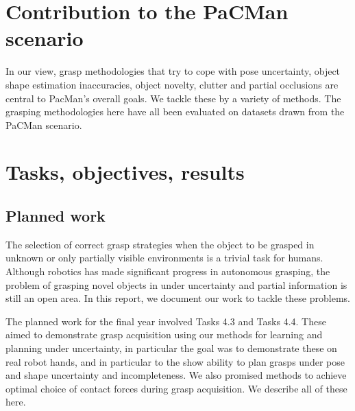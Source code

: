 \documentclass[a4paper,11pt,pdf]{pacmanreport}
\begin{document}
\section*{Contribution to the PaCMan scenario}

In our view, grasp methodologies that try to cope with pose uncertainty, object shape estimation inaccuracies, object novelty, clutter and partial occlusions are central to PacMan's overall goals. We tackle these by a variety of methods. The grasping methodologies here have all been evaluated on datasets drawn from the PaCMan scenario.

\newpage

\section{Tasks, objectives, results}

\subsection{Planned work}

The selection of correct grasp strategies when the object to be grasped in unknown or only partially visible environments is a trivial task for humans. Although robotics has made significant progress in autonomous grasping, the problem of grasping novel objects in under uncertainty and partial information is still an open area. In this report, we document our work to tackle these problems.

The planned work for the final year involved Tasks 4.3 and Tasks 4.4. These aimed to demonstrate grasp acquisition using our methods for learning and planning under uncertainty, in particular the goal was to demonstrate these on real robot hands, and in particular to the show ability to plan grasps under pose and shape uncertainty and incompleteness. We also promised methods to achieve optimal choice of contact forces during grasp acquisition.  We describe all of these here.

\end{document}

